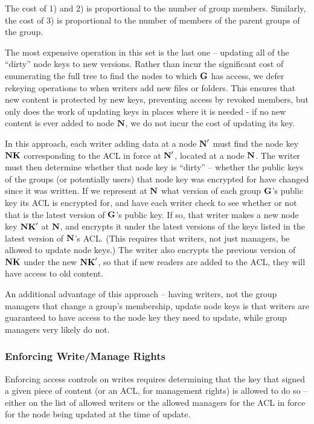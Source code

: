 The cost of 1) and 2) is proportional to the number of group
members. Similarly, the cost of 3) is proportional to the number of
members of the parent groups of the group.

The most expensive operation in this set is the last one -- updating
all of the ``dirty'' node keys to new versions. Rather than incur the
significant cost of enumerating the full tree to find the nodes to
which ${\textbf{G}}$ has access, we defer rekeying operations to when writers
add new files or folders. This ensures that new content is protected
by new keys, preventing access by revoked members, but only does the
work of updating keys in places where it is needed - if no new content
is ever added to node ${\textbf{N}}$, we do not incur the cost of updating its
key.

In this approach, each writer adding data at a node ${\textbf{N}}'$ must find
the node key ${\textbf{NK}}$ corresponding to the ACL in force at ${\textbf{N}}'$, located
at a node ${\textbf{N}}$. The writer must then determine whether that node key
is ``dirty'' -- whether the public keys of the groups (or potentially
users) that node key was encrypted for have changed since it was
written. If we represent at ${\textbf{N}}$ what version of each group ${\textbf{G}}$'s
public key its ACL is encrypted for, and have each writer check to see
whether or not that is the latest version of ${\textbf{G}}$'s public key. If so,
that writer makes a new node key ${\textbf{NK}}'$ at ${\textbf{N}}$, and encrypts it under
the latest versions of the keys listed in the latest version of ${\textbf{N}}$'s
ACL. (This requires that writers, not just managers, be allowed to
update node keys.) The writer also encrypts the previous version of
${\textbf{NK}}$ under the new ${\textbf{NK}}'$, so that if new readers are added to the
ACL, they will have access to old content.

An additional advantage of this approach -- having writers, not the
group managers that change a group's membership, update node keys is
that writers are guaranteed to have access to the node key they need
to update, while group managers very likely do not.

\subsubsection{Enforcing Write/Manage Rights}
\label{sec:EnforcingWriteManageRights}

Enforcing access controls on writes requires determining that the key
that signed a given piece of content (or an ACL, for management
rights) is allowed to do so -- either on the list of allowed writers
or the allowed managers for the ACL in force for the node being
updated at the time of update.

